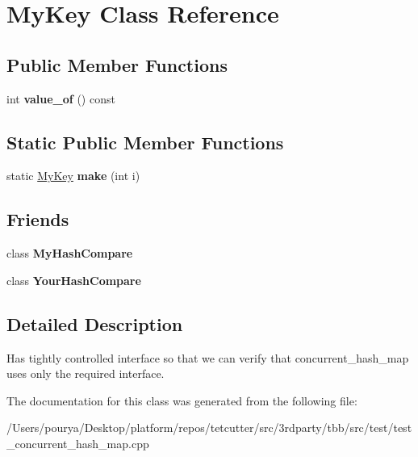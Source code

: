 \hypertarget{classMyKey}{}\section{My\+Key Class Reference}
\label{classMyKey}
\subsection*{Public Member Functions}
\begin{DoxyCompactItemize}
\item 
\hypertarget{classMyKey_a61d8bf7ad4c993250bfc36617e097cca}{}int {\bfseries value\+\_\+of} () const \label{classMyKey_a61d8bf7ad4c993250bfc36617e097cca}

\end{DoxyCompactItemize}
\subsection*{Static Public Member Functions}
\begin{DoxyCompactItemize}
\item 
\hypertarget{classMyKey_a528f881a8db29370048cd948561baf8a}{}static \hyperlink{classMyKey}{My\+Key} {\bfseries make} (int i)\label{classMyKey_a528f881a8db29370048cd948561baf8a}

\end{DoxyCompactItemize}
\subsection*{Friends}
\begin{DoxyCompactItemize}
\item 
\hypertarget{classMyKey_aac9e909dc18764f599492223a806b9ea}{}class {\bfseries My\+Hash\+Compare}\label{classMyKey_aac9e909dc18764f599492223a806b9ea}

\item 
\hypertarget{classMyKey_ac8ec285c152bbd826203b51060fae06c}{}class {\bfseries Your\+Hash\+Compare}\label{classMyKey_ac8ec285c152bbd826203b51060fae06c}

\end{DoxyCompactItemize}


\subsection{Detailed Description}
Has tightly controlled interface so that we can verify that concurrent\+\_\+hash\+\_\+map uses only the required interface. 

The documentation for this class was generated from the following file\+:\begin{DoxyCompactItemize}
\item 
/\+Users/pourya/\+Desktop/platform/repos/tetcutter/src/3rdparty/tbb/src/test/test\+\_\+concurrent\+\_\+hash\+\_\+map.\+cpp\end{DoxyCompactItemize}
